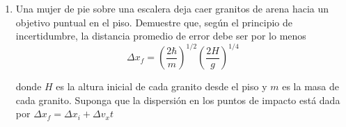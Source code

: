 \documentclass[letterpaper,11pt]{article}
\begin{document}
\begin{enumerate}

\item Una mujer de pie sobre una escalera deja caer granitos de arena hacia un objetivo puntual en el piso. Demuestre que, según el principio de incertidumbre, la distancia promedio de error debe ser por lo menos
$$\Delta x_f = \left(\frac{2 \hbar}{m}\right)^{1/2}\left(\frac{2H}{g}\right)^{1/4}$$

donde $H$ es la altura inicial de cada granito desde el piso y $m$ es la masa de cada granito. Suponga que la dispersión en los puntos de impacto está dada por $\Delta x_f = \Delta x_i + \Delta v_x t$

%   

\end{enumerate}
\end{document}
